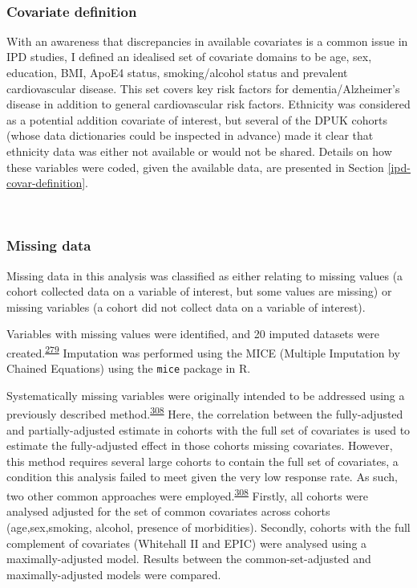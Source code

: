 \documentclass[a4paper, twoside]{templates/ociamthesis}
\begin{document}
~

\hypertarget{covariate-definition}{%
\subsubsection{Covariate definition}\label{covariate-definition}}

With an awareness that discrepancies in available covariates is a common issue in IPD studies, I defined an idealised set of covariate domains to be age, sex, education, BMI, ApoE4 status, smoking/alcohol status and prevalent cardiovascular disease. This set covers key risk factors for dementia/Alzheimer's disease in addition to general cardiovascular risk factors. Ethnicity was considered as a potential addition covariate of interest, but several of the DPUK cohorts (whose data dictionaries could be inspected in advance) made it clear that ethnicity data was either not available or would not be shared. Details on how these variables were coded, given the available data, are presented in Section \ref{ipd-covar-definition}.

~

\hypertarget{missing-data-2}{%
\subsubsection{Missing data}\label{missing-data-2}}

Missing data in this analysis was classified as either relating to missing values (a cohort collected data on a variable of interest, but some values are missing) or missing variables (a cohort did not collect data on a variable of interest).

Variables with missing values were identified, and 20 imputed datasets were created.\textsuperscript{\protect\hyperlink{ref-sterne2009}{279}} Imputation was performed using the MICE (Multiple Imputation by Chained Equations) using the \texttt{mice} package in R.

Systematically missing variables were originally intended to be addressed using a previously described method.\textsuperscript{\protect\hyperlink{ref-fibrinogenstudiescollaboration2009}{308}} Here, the correlation between the fully-adjusted and partially-adjusted estimate in cohorts with the full set of covariates is used to estimate the fully-adjusted effect in those cohorts missing covariates. However, this method requires several large cohorts to contain the full set of covariates, a condition this analysis failed to meet given the very low response rate. As such, two other common approaches were employed.\textsuperscript{\protect\hyperlink{ref-fibrinogenstudiescollaboration2009}{308}} Firstly, all cohorts were analysed adjusted for the set of common covariates across cohorts (age,sex,smoking, alcohol, presence of morbidities). Secondly, cohorts with the full complement of covariates (Whitehall II and EPIC) were analysed using a maximally-adjusted model. Results between the common-set-adjusted and maximally-adjusted models were compared.
\end{document}
